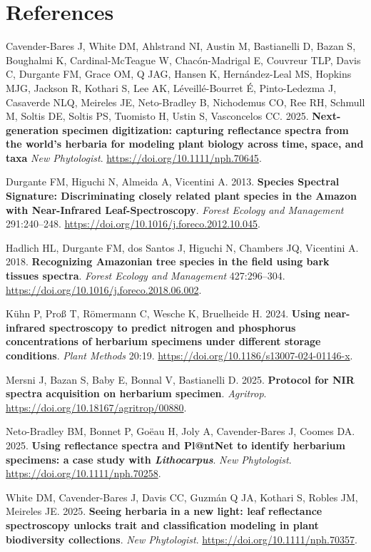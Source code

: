 \documentclass[
  letterpaper,
  DIV=11,
  numbers=noendperiod]{scrreprt}
\begin{document}

\chapter{References}\label{references}

Cavender-Bares J, White DM, Ahlstrand NI, Austin M, Bastianelli D, Bazan
S, Boughalmi K, Cardinal-McTeague W, Chacón-Madrigal E, Couvreur TLP,
Davis C, Durgante FM, Grace OM, Q JAG, Hansen K, Hernández-Leal MS,
Hopkins MJG, Jackson R, Kothari S, Lee AK, Léveillé-Bourret É,
Pinto-Ledezma J, Casaverde NLQ, Meireles JE, Neto-Bradley B, Nichodemus
CO, Ree RH, Schmull M, Soltis DE, Soltis PS, Tuomisto H, Ustin S,
Vasconcelos CC. 2025. \textbf{Next-generation specimen digitization:
capturing reflectance spectra from the world's herbaria for modeling
plant biology across time, space, and taxa} \emph{New Phytologist}.
\url{https://doi.org/10.1111/nph.70645}.

Durgante FM, Higuchi N, Almeida A, Vicentini A. 2013. \textbf{Species
Spectral Signature: Discriminating closely related plant species in the
Amazon with Near-Infrared Leaf-Spectroscopy}. \emph{Forest Ecology and
Management} 291:240--248.
\url{https://doi.org/10.1016/j.foreco.2012.10.045}.

Hadlich HL, Durgante FM, dos Santos J, Higuchi N, Chambers JQ, Vicentini
A. 2018. \textbf{Recognizing Amazonian tree species in the field using
bark tissues spectra}. \emph{Forest Ecology and Management}
427:296--304. \url{https://doi.org/10.1016/j.foreco.2018.06.002}.

Kühn P, Proß T, Römermann C, Wesche K, Bruelheide H. 2024. \textbf{Using
near-infrared spectroscopy to predict nitrogen and phosphorus
concentrations of herbarium specimens under different storage
conditions}. \emph{Plant Methods} 20:19.
\url{https://doi.org/10.1186/s13007-024-01146-x}.

Mersni J, Bazan S, Baby E, Bonnal V, Bastianelli D. 2025.
\textbf{Protocol for NIR spectra acquisition on herbarium specimen}.
\emph{Agritrop}. \url{https://doi.org/10.18167/agritrop/00880}.

Neto-Bradley BM, Bonnet P, Goëau H, Joly A, Cavender-Bares J, Coomes DA.
2025. \textbf{Using reflectance spectra and Pl@ntNet to identify
herbarium specimens: a case study with \emph{Lithocarpus}}. \emph{New
Phytologist}. \url{https://doi.org/10.1111/nph.70258}.

White DM, Cavender-Bares J, Davis CC, Guzmán Q JA, Kothari S, Robles JM,
Meireles JE. 2025. \textbf{Seeing herbaria in a new light: leaf
reflectance spectroscopy unlocks trait and classification modeling in
plant biodiversity collections}. \emph{New Phytologist}.
\url{https://doi.org/10.1111/nph.70357}.
\end{document}
